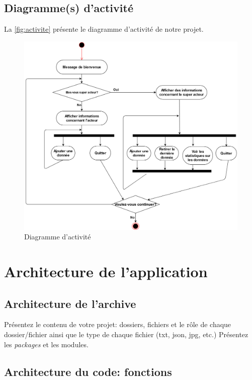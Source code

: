 \documentclass[11pt,a4paper]{article}
\begin{document}
\subsection{Diagramme(s) d'activité}

La \autoref{fig:activite} présente le diagramme d'activité de notre projet.

\begin{figure}[tb]
  \centering
  \includegraphics[width=\linewidth]{diagramme_activite}
  \caption{Diagramme d'activité}
  \label{fig:activite}
\end{figure}

\section{Architecture de l'application}

\subsection{Architecture de l'archive}

Présentez le contenu de votre projet: dossiers, fichiers et le rôle de chaque dossier/fichier ainsi que le type de chaque fichier (txt, json, jpg, etc.)
Présentez les \emph{packages} et les modules.

\subsection{Architecture du code: fonctions}
\end{document}

